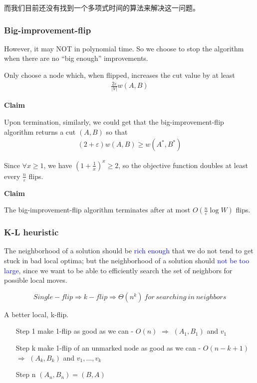 \documentclass{article}
\begin{document}
而我们目前还没有找到一个多项式时间的算法来解决这一问题。

\subsubsection{Big-improvement-flip}

However, it may NOT in polynomial time. So we choose to stop the algorithm when there are no “big enough” improvements.

Only choose a node which, when flipped, increases the cut value by at least
\begin{align*}
    \frac{2\varepsilon}{|V|}w(A,B)
\end{align*}

\textbf{Claim}\par
Upon termination, similarly, we could get that the big-improvement-flip algorithm returns a cut $(A, B)$ so that
\begin{align*}
    (2+\varepsilon)w(A, B)\ge w(A^*, B^*)
\end{align*}

Since $\forall x\ge 1$, we have $\left( 1+\frac{1}{x} \right)^x\ge 2$, so the objective function doubles at least every $\frac{n}{\varepsilon}$  flips.

\textbf{Claim}\par
The big-improvement-flip algorithm terminates after at most $O\left( \frac{n}{\varepsilon}\log W \right)$ flips.

\subsubsection{K-L heuristic}

The neighborhood of a solution should be \textcolor{blue}{rich enough} that we do not tend to get stuck in bad local optima; but the neighborhood of a solution should \textcolor{blue}{not be too large}, since we want to be able to efficiently search the set of neighbors for possible local moves.

$$Single-flip \Rightarrow k-flip \Rightarrow \Theta (n^k)\  for \ searching \ in \ neighbors$$

A better local, k-flip. 
\begin{enumerate}
    \item [Step 1] make 1-flip as good as we can - $O(n)$ $\Rightarrow$ $(A_1, B_1)$ and $v_1$
    \item [Step k] make 1-flip of an unmarked node as good as we can - $O(n-k+1)$ $\Rightarrow$ $(A_k, B_k)$ and $v_1, \dots, v_k$
    \item [Step n] $(A_n, B_n)=(B, A)$
\end{enumerate}
\end{document}
